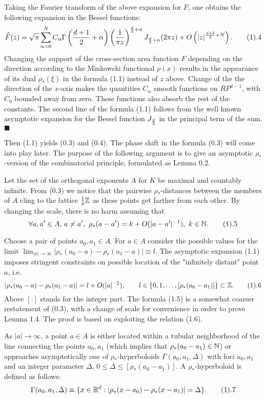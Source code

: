 Taking the Fourier transform of the above expansion  for $F$,
one obtains the following expansion in the Bessel functions:
$$
\widehat F(z)=\sqrt{\pi}\sum_{\alpha=0}^N C_\alpha\Gamma \left(
{d+1\over2}+\alpha\right)\left( {1\over \pi
z}\right)^{{d\over2}+\alpha} J_{{d\over2}+\alpha}(2\pi z) +
O\left(|z|^{{d+3\over2}+N} \right). \tag1.4$$ Changing the
support of the cross-section area function $F$ depending on  the
direction according to the Minkowski functional $\rho(x)$
results in the appearance of its dual $\rho_*(\xi)$ in the
formula (1.1) instead of $z$ above. Change of the the direction
of the $x$-axis makes the quantities $C_\alpha$ smooth functions
on $RP^{d-1}$, with $C_0$ bounded away from zero. These
functions also absorb the rest of the constants. The second line
of the formula (1.1) follows from the well known asymptotic
expansion for the Bessel function $J_{d\over2}$ in the principal
term of the sum. $\blacksquare$



Then (1.1) yields (0.3) and (0.4). The phase shift in the
formula (0.3)  will come into play later. The purpose of the
following argument is to give an asymptotic $\rho_*$-version of
the combinatorial principle, formulated as Lemma 0.2.

Let the set of the orthogonal exponents $A$ for $K$ be maximal
and  countably infinite. From (0.3) we notice that the pairwise
$\rho_*$-distances between the members of  $A$ cling to the
lattice ${1\over8}\Bbb Z$ as these points get farther from each
other. By changing the scale, there is no harm assuming that
$$\forall a,a'\in A,\,a\neq a',\,\,\rho_*(a-a')=k+
O(|a-a'|^{-1}), \,\, k \in {\Bbb N}. \tag1.5 $$


Choose a pair of points $a_0,a_1\in A$. For $a\in A$ consider
the  possible values for the limit
$\lim_{|a|\rightarrow\infty}|\rho_*(a_0-a)-\rho_*(a_1-a)|\equiv
l$. The asymptotic expansion (1.1) imposes stringent constraints
on possible location of the "infinitely distant" point $a$, i.e.
$$
|\rho_*(a_0-a)-\rho_*(a_1-a)|=l+O(|a|^{-2}),\qquad
l\in\{0,1,\ldots, [\rho_*(a_0-a_1)]\}\subset{\Bbb Z}. \tag1.6$$
Above $[\cdot]$ stands for the integer part.  The formula (1.5)
is a  somewhat coarser restatement of (0.3), with a change of
scale for convenience in order to prove Lemma 1.4. The proof is based on
exploiting the relation (1.6).

 As $|a|\rightarrow\infty$, a point $a\in A$
is either located within a tubular neighborhood of the line
connecting the points $a_0,a_1$ (which implies that
$\rho_*(a_0-a_1)\in {\Bbb N}$) or approaches asymptotically  one
of $\rho_*$-hyperboloids $\Gamma(a_0,a_1, \Delta)$ with  foci
$a_{0},a_1$ and an integer parameter
$\Delta,\,0\leq\Delta\leq[\rho_*(a_0-a_1)]$. A
$\rho_*$-hyperboloid is defined as follows:
$$ \Gamma(a_0,a_1,\Delta)\equiv\{x \in {\Bbb R}^d:
|\rho_*(x-a_0)-\rho_*(x-a_1)|= \Delta\}.\tag1.7 $$
\endproclaim

